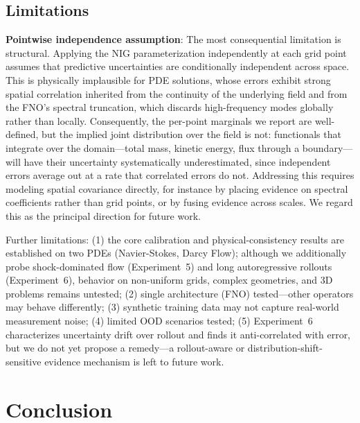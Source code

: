 \subsection{Limitations}
\label{sec:limitations}

\textbf{Pointwise independence assumption}: The most consequential limitation is structural. Applying the NIG
parameterization independently at each grid point assumes that predictive uncertainties are conditionally
independent across space. This is physically implausible for PDE solutions, whose errors exhibit strong spatial
correlation inherited from the continuity of the underlying field and from the FNO's spectral truncation, which
discards high-frequency modes globally rather than locally. Consequently, the per-point marginals we report are
well-defined, but the implied joint distribution over the field is not: functionals that integrate over the
domain---total mass, kinetic energy, flux through a boundary---will have their uncertainty systematically
underestimated, since independent errors average out at a rate that correlated errors do not. Addressing this
requires modeling spatial covariance directly, for instance by placing evidence on spectral coefficients rather
than grid points, or by fusing evidence across scales. We regard this as the principal direction for future work.

Further limitations: (1) the core calibration and physical-consistency results are established on two PDEs
(Navier-Stokes, Darcy Flow); although we additionally probe shock-dominated flow (Experiment~5) and long
autoregressive rollouts (Experiment~6), behavior on non-uniform grids, complex geometries, and 3D problems
remains untested; (2) single architecture (FNO) tested---other operators may behave differently; (3) synthetic
training data may not capture real-world measurement noise; (4) limited OOD scenarios tested; (5) Experiment~6
characterizes uncertainty drift over rollout and finds it anti-correlated with error, but we do not yet propose
a remedy---a rollout-aware or distribution-shift-sensitive evidence mechanism is left to future work.

\section{Conclusion}

